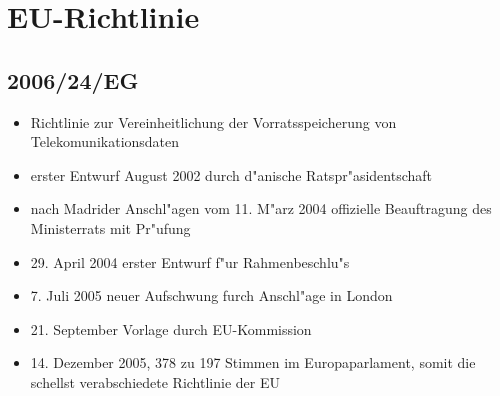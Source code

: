 
\section{EU-Richtlinie}
    \subsection{2006/24/EG}
    \begin{frame}
      \begin{itemize}
        \item
          Richtlinie zur Vereinheitlichung der Vorratsspeicherung von Telekomunikationsdaten
        \item
          erster Entwurf August 2002 durch d"anische Ratspr"asidentschaft
        \item
          nach Madrider Anschl"agen vom 11. M"arz 2004 offizielle Beauftragung des Ministerrats mit Pr"ufung
        \item
          29. April 2004 erster Entwurf f"ur Rahmenbeschlu"s
        \item 
          7. Juli 2005 neuer Aufschwung furch Anschl"age in London
        \item
          21. September Vorlage durch EU-Kommission
        \item
          14. Dezember 2005, 378 zu 197 Stimmen im Europaparlament, somit die schellst verabschiedete Richtlinie der EU


      \end{itemize}
    \end{frame}

